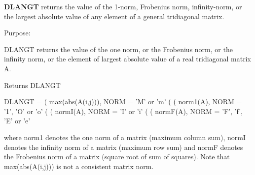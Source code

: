 {\bfseries D\+L\+A\+N\+G\+T} returns the value of the 1-\/norm, Frobenius norm, infinity-\/norm, or the largest absolute value of any element of a general tridiagonal matrix. 

 \begin{DoxyParagraph}{Purpose\+: }
\begin{DoxyVerb} DLANGT  returns the value of the one norm,  or the Frobenius norm, or
 the  infinity norm,  or the  element of  largest absolute value  of a
 real tridiagonal matrix A.\end{DoxyVerb}

\end{DoxyParagraph}
\begin{DoxyReturn}{Returns}
D\+L\+A\+N\+G\+T \begin{DoxyVerb}    DLANGT = ( max(abs(A(i,j))), NORM = 'M' or 'm'
             (
             ( norm1(A),         NORM = '1', 'O' or 'o'
             (
             ( normI(A),         NORM = 'I' or 'i'
             (
             ( normF(A),         NORM = 'F', 'f', 'E' or 'e'

 where  norm1  denotes the  one norm of a matrix (maximum column sum),
 normI  denotes the  infinity norm  of a matrix  (maximum row sum) and
 normF  denotes the  Frobenius norm of a matrix (square root of sum of
 squares).  Note that  max(abs(A(i,j)))  is not a consistent matrix norm.\end{DoxyVerb}
 
\end{DoxyReturn}

